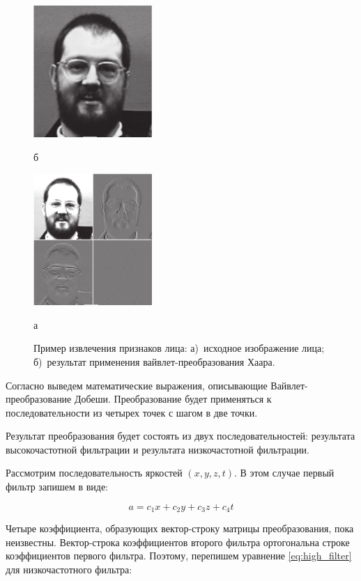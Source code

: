 \begin{figure}[hbt!]
    \centering
    \parbox{6cm}{
        \centering
        \includegraphics[height=5cm]{debosh_haar.png}
        \caption*{б}
    }\qquad
    \begin{minipage}{6cm}
        \centering
        \includegraphics[height=5cm]{debosh_haar_2.png}
        \caption*{а}
    \end{minipage}
    \captionsetup{justification=centering}
    \caption{Пример извлечения признаков лица: а)~исходное изображение лица; б)~результат применения вайвлет-преобразования Хаара.}
    \label{fig:dobeshi_haar}
\end{figure}

Согласно \cite{vaivlet_1} выведем математические выражения, описывающие Вайвлет-преобра\-зование Добеши.
Преобразование будет применяться к последовательности из четырех точек с шагом в две точки.

Результат преобразования будет состоять из двух последовательностей: результата высокочастотной фильтрации и результата
низкочастотной фильтрации.

Рассмотрим последовательность яркостей $ (x,y,z,t) $. В этом случае первый фильтр запишем в виде:

\begin{equation}
    a = c_1x + c_2y + c_3z + c_4t
    \label{eq:high_filter}
\end{equation}

Четыре коэффициента, образующих вектор-строку матрицы преобразования, пока неизвестны.
Вектор-строка коэффициентов второго фильтра ортогональна строке коэффициентов первого фильтра.
Поэтому, перепишем уравнение \ref{eq:high_filter} для низкочастотного фильтра:


